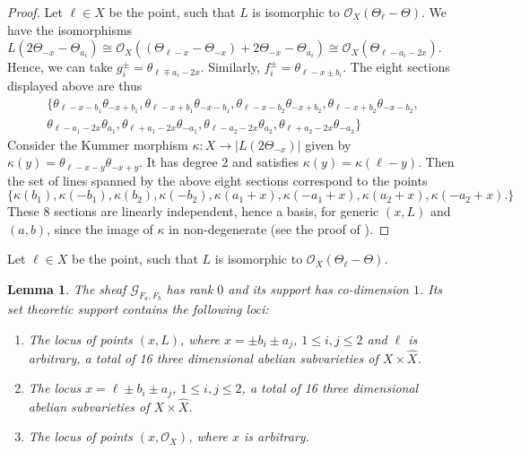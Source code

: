 \documentclass[12pt]{amsart}
\numberwithin{equation}{subsection}
\theoremstyle{plain}
\newtheorem{lem}[thm]{Lemma}
\theoremstyle{definition}
\newcommand{\G}{{\mathcal G}}
\newcommand{\StructureSheaf}[1]{{\mathcal O}_{#1}}
\begin{document}
{\begin{proof}
Let $\ell\in X$ be the point, such that $L$ is isomorphic to $\StructureSheaf{X}(\Theta_\ell-\Theta)$.
We have the isomorphisms
$L(2\Theta_{-x}-\Theta_{a_i})\cong 
\StructureSheaf{X}((\Theta_{\ell-x}-\Theta_{-x})+2\Theta_{-x}-\Theta_{a_i})\cong
\StructureSheaf{X}(\Theta_{\ell-a_i-2x})$. Hence, we can take $g^{\pm}_i=\theta_{\ell\mp a_i-2x}$.
Similarly, $f_i^\pm=\theta_{\ell-x\pm b_i}$. The eight sections displayed above are thus
\begin{eqnarray*}
\{
\theta_{\ell-x-b_1}\theta_{-x+b_1},\theta_{\ell-x+b_1}\theta_{-x-b_1},
\theta_{\ell-x-b_2}\theta_{-x+b_2}, \theta_{\ell-x+b_2}\theta_{-x-b_2},
\\
\theta_{\ell-a_1-2x}\theta_{a_1}, \theta_{\ell+a_1-2x}\theta_{-a_1},
\theta_{\ell-a_2-2x}\theta_{a_2}, \theta_{\ell+a_2-2x}\theta_{-a_2}
\}
\end{eqnarray*}
Consider the Kummer morphism $\kappa:X\rightarrow |L(2\Theta_{-x})|$ given by
$\kappa(y)=\theta_{\ell-x-y}\theta_{-x+y}$. It has degree $2$ and satisfies $\kappa(y)=\kappa(\ell-y)$.
Then the set of lines spanned by the above eight sections correspond to the points
\begin{equation}
\label{eq-8-points-in-the-image-of-the-kummer-map}
\{
\kappa(b_1),\kappa(-b_1),\kappa(b_2),\kappa(-b_2),\kappa(a_1+x),\kappa(-a_1+x),\kappa(a_2+x),\kappa(-a_2+x).
\}
\end{equation}
These $8$ sections are linearly independent, hence a basis, for generic $(x,L)$ and $(a,b)$, since the image of $\kappa$ in non-degenerate
(see the proof of \cite[Lemma 5.1]{gulbrandsen}).
\end{proof} 

Let $\ell\in X$ be the point, such that $L$ is isomorphic to $\StructureSheaf{X}(\Theta_\ell-\Theta)$.

\begin{lem}
\label{lemma-relative-extension-sheaf-does-not-vanish}
The sheaf $\G_{F_a,F_b}$ has rank $0$ and its support has co-dimension $1$. Its set theoretic support contains the following loci:
\begin{enumerate}
\item
The locus of points $(x,L)$, where
$x=\pm b_i\pm a_j$, $1\leq i,j\leq 2$ and $\ell$ is arbitrary, a total of 16 three dimensional abelian subvarieties of $X\times \hat{X}$.
\item
\label{lemma-item-second-locus}
 The locus
$x=\ell\pm b_i\pm a_j$, $1\leq i,j\leq 2$, a total of 16 three dimensional abelian subvarieties of $X\times \hat{X}$.
\item 
The locus of points $(x,\StructureSheaf{X})$, where $x$ is arbitrary.
\end{enumerate}
\end{lem}


}
\end{document}
